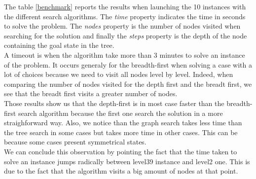 \documentclass[10pt,a4paper]{article}
\begin{document}
\begin{enumerate}
	The table \ref{benchmark} reports the results when launching the 10 instances with the different search algorithms. The \textit{time} property indicates the time in seconds to solve the problem. The \textit{nodes} property is the number of nodes visited when searching for the solution and finally the \textit{steps} property is the depth of the node containing the goal state in the tree. \\
	
	A timeout is when the algorithm take more than 3 minutes to solve an instance of the problem. It occurs generaly for the breadth-first when solving a case with a lot of choices because we need to visit all nodes level by level. Indeed, when comparing the number of nodes visited for the depth first and the breadt first, we see that the breadt first visits a greater number of nodes.\\
	
	Those results show us that the depth-first is in most case faster than the breadth-first search algorithm because the first one search the solution in a more straighforward way. Also, we notice than the graph search takes less time than the tree search in some cases but takes more time in other cases. This can be because some cases present symmetrical states. \\
	
	We can conclude this observation by pointing the fact that the time taken to solve an instance jumps radically between level39 instance and level2 one. This is due to the fact that the algorithm visits a big amount of nodes at that point.
	

\end{enumerate}
\end{document}
